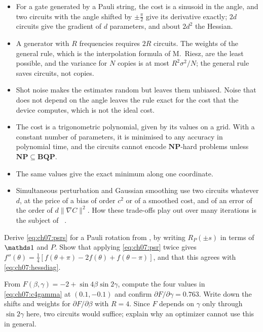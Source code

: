 \documentclass[handoutsbeamer.tex]{subfiles}
\begin{document}
\begin{frame}
\onp{\footnotesize}
\begin{itemize}\setlength\itemsep{0.2em}
    \item For a gate generated by a Pauli string, the cost is a sinusoid in the angle, and two circuits with the angle shifted by $\pm\frac\pi2$ give its derivative exactly; $2d$ circuits give the gradient of $d$ parameters, and about $2d^2$ the Hessian.
    \item A generator with $R$ frequencies requires $2R$ circuits. The weights of the general rule, which is the interpolation formula of M.~Riesz, are the least possible, and the variance for $N$ copies is at most $R^2\sigma^2/N$; the general rule saves circuits, not copies.
    \item Shot noise makes the estimates random but leaves them unbiased. Noise that does not depend on the angle leaves the rule exact for the cost that the device computes, which is not the ideal cost.
    \item The cost is a trigonometric polynomial, given by its values on a grid. With a constant number of parameters, it is minimised to any accuracy in polynomial time, and the circuits cannot encode $\mathbf{NP}$-hard problems unless $\mathbf{NP}\subseteq\mathbf{BQP}$.
    \item The same values give the exact minimum along one coordinate.
    \item Simultaneous perturbation and Gaussian smoothing use two circuits whatever $d$, at the price of a bias of order $c^2$ or of a smoothed cost, and of an error of the order of $d\|\nabla C\|^2$. How these trade-offs play out over many iterations is the subject of \Chap~.
\end{itemize}
\end{frame}


\begin{frame}
\onp{\footnotesize}
\begin{exe}\label{exe:ch07:shift}
Derive \eqref{eq:ch07:psrs} for a Pauli rotation from , by writing $R_P(\pm s)$ in terms of $\one$ and $P$. Show that applying \eqref{eq:ch07:psr} twice gives $f''(\theta) = \frac14[f(\theta+\pi)-2f(\theta)+f(\theta-\pi)]$, and that this agrees with \eqref{eq:ch07:hessdiag}.
\end{exe}
\begin{exe}\label{exe:ch07:c4}
From $F(\beta,\gamma) = -2+\sin4\beta\sin2\gamma$, compute the four values in \eqref{eq:ch07:c4gamma} at $(0.1,-0.1)$ and confirm $\partial F/\partial\gamma = 0.763$. Write down the shifts and weights for $\partial F/\partial\beta$ with $R = 4$. Since $F$ depends on $\gamma$ only through $\sin2\gamma$ here, two circuits would suffice; explain why an optimizer cannot use this in general.
\end{exe}
\end{frame}
\end{document}
